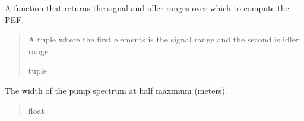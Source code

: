 \documentclass[a4paper,10pt,english]{sphinxmanual}
\begin{document}
\begin{fulllineitems}
\begin{fulllineitems}
\begin{quote}
\begin{description}
\end{description}\end{quote}

\end{fulllineitems}


\begin{fulllineitems}
\label{\detokenize{pump:pyjsa.pump.Pump.signal_idler_ranges}}
\pysigstartsignatures
{}
\pysigstopsignatures
\sphinxAtStartPar
A function that returns the signal and idler ranges over which to compute the PEF.
\begin{quote}\begin{description}
\sphinxAtStartPar
A tuple where the first elements is the signal range and the second is idler range.

\sphinxAtStartPar
tuple

\end{description}\end{quote}

\end{fulllineitems}


\begin{fulllineitems}
\label{\detokenize{pump:pyjsa.pump.Pump.width}}
\pysigstartsignatures
{}
\pysigstopsignatures
\sphinxAtStartPar
The width of the pump spectrum at half maximum (meters).
\begin{quote}\begin{description}
\sphinxAtStartPar
float

\end{description}\end{quote}

\end{fulllineitems}


\end{fulllineitems}


\sphinxstepscope
\end{document}
